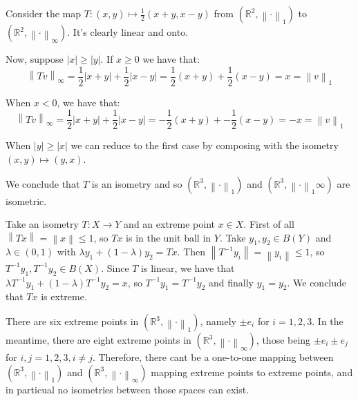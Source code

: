 \documentclass[11pt]{article} %
\newcommand{\norm}[1]{\left\lVert#1\right\rVert}
\newcommand{\abs}[1]{\left|#1\right|}
\begin{document}
\begin{Answer}
\begin{enumerate}
\begin{item}
Consider the map $T: \left(x, y\right) \mapsto \frac{1}{2}\left(x + y, x - y\right)$ from $\left(\mathbb{R}^2, \norm{\cdot}_1 \right)$ to $\left(\mathbb{R}^2, \norm{\cdot}_\infty \right)$. It's clearly linear and onto.

Now, suppose $\abs{x} \geq \abs{y}$. If $x \geq 0$ we have that:
\[ \norm{Tv}_\infty = \frac{1}{2}\abs{x + y} + \frac{1}{2}\abs{x-y} = \frac{1}{2}\left(x + y\right) + \frac{1}{2}\left(x - y\right) = x = \norm{v}_1 \]

When $x < 0$, we have that:
\[ \norm{Tv}_\infty = \frac{1}{2}\abs{x + y} + \frac{1}{2}\abs{x-y} = -\frac{1}{2}\left(x + y\right) + -\frac{1}{2}\left(x - y\right) = -x = \norm{v}_1 \]

When $\abs{y} \geq \abs{x}$ we can reduce to the first case by composing with the isometry $\left(x,y\right) \mapsto \left(y,x\right)$.

We conclude that $T$ is an isometry and so $\left(\mathbb{R}^3, \norm{\cdot}_1 \right)$ and $\left(\mathbb{R}^3, \norm{\cdot}_1\infty \right)$ are isometric.
\end{item}
\begin{item}
Take an isometry $T: X\to Y$ and an extreme point $x\in X$. First of all $\norm{Tx} = \norm{x} \leq 1$, so $Tx$ is in the unit ball in $Y$. Take $y_1, y_2 \in B\left(Y\right)$ and $\lambda \in \left(0, 1\right)$ with $\lambda y_1 + \left(1 - \lambda\right)y_2 = Tx$. Then $\norm{T^{-1}y_i} = \norm{y_i} \leq 1$, so $T^{-1}y_1, T^{-1}y_2 \in B\left(X\right)$. Since $T$ is linear, we have that $\lambda T^{-1}y_1 + \left(1-\lambda\right)T^{-1}y_2 = x$, so $T^{-1}y_1 = T^{-1}y_2$ and finally $y_1 = y_2$. We conclude that $Tx$ is extreme.
\end{item}

\begin{item}
There are six extreme points in $\left(\mathbb{R}^3, \norm{\cdot}_1 \right)$, namely $\pm e_i$ for $i=1,2,3$. In the meantime, there are eight extreme points in $\left(\mathbb{R}^3, \norm{\cdot}_\infty \right)$, those being $\pm e_i \pm e_j$ for $i,j = 1,2,3, i\neq j$. Therefore, there cant be a one-to-one mapping between $\left(\mathbb{R}^3, \norm{\cdot}_1 \right)$ and $\left(\mathbb{R}^3, \norm{\cdot}_\infty \right)$ mapping extreme points to extreme points, and in particual no isometries between those spaces can exist.
\end{item}
\end{enumerate}
\end{Answer}
\end{document}
